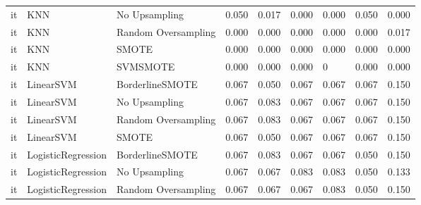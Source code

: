 \begin{tabular}{lllllllll}
      it &                          KNN &       No Upsampling & 0.050 &                     0.017 &                 0.000 &                  0.000 &                                   0.050 &     0.000 \\
      it &                          KNN & Random Oversampling & 0.000 &                     0.000 &                 0.000 &                  0.000 &                                   0.000 &     0.017 \\
      it &                          KNN &               SMOTE & 0.000 &                     0.000 &                 0.000 &                  0.000 &                                   0.000 &     0.000 \\
      it &                          KNN &            SVMSMOTE & 0.000 &                     0.000 &                 0.000 &                      0 &                                   0.000 &     0.000 \\
      it &                    LinearSVM &     BorderlineSMOTE & 0.067 &                     0.050 &                 0.067 &                  0.067 &                                   0.067 &     0.150 \\
      it &                    LinearSVM &       No Upsampling & 0.067 &                     0.083 &                 0.067 &                  0.067 &                                   0.067 &     0.150 \\
      it &                    LinearSVM & Random Oversampling & 0.067 &                     0.083 &                 0.067 &                  0.067 &                                   0.067 &     0.150 \\
      it &                    LinearSVM &               SMOTE & 0.067 &                     0.050 &                 0.067 &                  0.067 &                                   0.067 &     0.150 \\
      it &           LogisticRegression &     BorderlineSMOTE & 0.067 &                     0.083 &                 0.067 &                  0.067 &                                   0.050 &     0.150 \\
      it &           LogisticRegression &       No Upsampling & 0.067 &                     0.067 &                 0.083 &                  0.083 &                                   0.050 &     0.133 \\
      it &           LogisticRegression & Random Oversampling & 0.067 &                     0.067 &                 0.067 &                  0.083 &                                   0.050 &     0.150 \\

\end{tabular}
